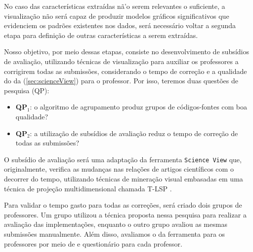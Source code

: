 	 	No caso das características extraídas nã'o serem relevantes o suficiente, a
	 	visualização não será capaz de produzir modelos gráficos significativos que
	 	evidenciem os padrões existentes nos dados, será necessário voltar a segunda
	 	etapa para definição de outras características a serem extraídas.
	 	
	 	Nosso objetivo, por meio dessas etapas, consiste no desenvolvimento de subsídios
	 	de avaliação, utilizando técnicas de visualização para auxiliar os professores a
	 	corrigirem todas as submissões, considerando o tempo de correção e a qualidade do
	 	 da  (\cref{sec:scienceView}) para o professor.
	 	Por isso, teremos duas questões de pesquisa (QP):
	 	
	 	\begin{itemize}
	 		\item \textbf{QP$_1$}: o algoritmo de agrupamento produz grupos de códigos-fontes
	 		com boa qualidade?
	 		\item \textbf{QP$_2$}: a utilização de subsídios de avaliação reduz o tempo
	 		de correção de todas as submissões?
	 	\end{itemize}
	 	
	 	O subsídio de avaliação será uma adaptação da ferramenta \texttt{Science View}
	 	\cite{Alencar-etal:2012} que, originalmente, verifica as mudanças nas relações
	 	de artigos científicos com o decorrer do tempo, utilizando técnicas de mineração
	 	visual embasadas em uma técnica de projeção multidimensional chamada \acl{T-LSP}
	 	\cite{Alencar}.
	 	
%	 	
%	 	
	 	Para validar o tempo gasto para todas as correções, será criado dois grupos de
	 	professores. Um grupo utilizou a técnica proposta nessa pesquisa para realizar
	 	a avaliação das implementações, enquanto o outro grupo avaliou as mesmas submissões
	 	manualmente. Além disso, avaliamos o  da ferramenta para os
	 	professores por meio de  e questionário para cada professor.
	 		

